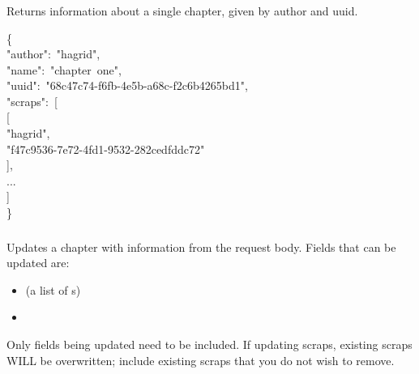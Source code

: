 \documentclass[onecolumn, draftclsnofoot, 10pt, compsoc]{IEEEtran}
\begin{document}
\subsubsection{}\label{sec-get-chaptersauthoruuid}%

\noindent Returns information about a single chapter, given by author and uuid.%
\begin{mdpre}%
\noindent\{\\
"author":~"hagrid",\\
"name":~"chapter~one",\\
"uuid":~"68c47c74-f6fb-4e5b-a68c-f2c6b4265bd1",\\
"scraps":~{}[\\
[\\
"hagrid",\\
"f47c9536-7e72-4fd1-9532-282cedfddc72"\\
],\\
...\\
]\\
\}%
\end{mdpre}
\subsubsection{}\label{sec-post-chaptersauthoruuid}%

\noindent Updates a chapter with information from the request body. Fields that can be updated
are:%

\begin{itemize}[noitemsep,topsep=\mdcompacttopsep]%

\item{} (a list of s)%

\item{}%
\end{itemize}%

\noindent Only fields being updated need to be included. If updating scraps,
existing scraps WILL be overwritten; include existing scraps that
you do not wish to remove.%
\end{document}
